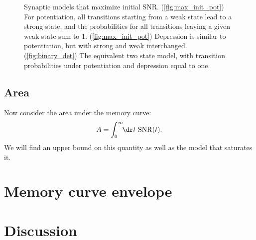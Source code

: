 \documentclass{article} %
\DeclareMathOperator{\snr}{SNR}
\begin{document}
\begin{figure}
 \begin{center}
 \begin{myenuma}
  \item\hp{}\label{fig:max_init_pot}\hp
  \item{}\label{fig:max_init_dep}\hp
  \item{}\label{fig:binary_det}
  \end{myenuma}
 \end{center}
  \caption{Synaptic models that maximize initial SNR. 
  (\ref{fig:max_init_pot}) For potentiation, all transitions starting from a weak state lead to a strong state, and the probabilities for all transitions leaving a given weak state sum to 1.
  (\ref{fig:max_init_pot}) Depression is similar to potentiation, but with strong and weak interchanged. 
  (\ref{fig:binary_det}) The equivalent two state model, with transition probabilities under potentiation and depression equal to one.
  }\label{fig:maxinit}
\end{figure}


\subsection{Area}\label{sec:area}

Now consider the area under the memory curve:
%
\begin{equation}\label{eq:area}
  A = \int_0^\infty\!\!\dr t \, \snr(t).
\end{equation}
%
We will find an upper bound on this quantity as well as the model that saturates it.



\section{Memory curve envelope}\label{sec:env}





\section{Discussion}\label{sec:disc}










\end{document}

